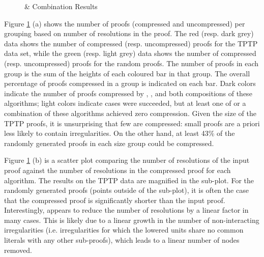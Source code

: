 {\begin{figure}[p]
 \caption{\GFOLU \& \FORPI Combination Results}
\label{fig:ex}

\end{figure}

Figure \ref{fig:ex} (a) shows the number of proofs (compressed and uncompressed) per grouping based on number of resolutions in the proof. The red (resp. dark grey) data shows the number of compressed (resp. uncompressed) proofs for the TPTP data set, while the green (resp. light grey) data shows the number of compressed (resp. uncompressed) proofs for the random proofs. The number of proofs in each group is the sum of the heights of each coloured bar in that group. The overall percentage of proofs compressed in a group is indicated on each bar. Dark colors indicate the number of proofs compressed by {\FORPI}, {\GFOLU}, and both compositions of these algorithms; light colors indicate cases were {\FORPI} succeeded, but at least one of {\GFOLU} or a combination of these algorithms achieved zero compression. 
Given the size of the TPTP proofs, it is unsurprising that few are compressed: small proofs are a priori less likely to contain irregularities. On the other hand, 
at least 43\% of the randomly generated proofs in each size group could be compressed.


Figure \ref{fig:ex} (b) is a scatter plot comparing the number of resolutions of the input proof against the number of resolutions in the compressed proof for each algorithm. The results on the TPTP data are magnified in the sub-plot. For the randomly generated proofs (points outside of the sub-plot), it is often the case that the compressed proof is significantly shorter than the input proof. Interestingly, {\GFOLU} appears to reduce the number of resolutions by a linear factor in many cases. This is likely due to a linear growth in the number of non-interacting irregularities (i.e. irregularities for which the lowered units share no common literals with any other sub-proofs), which leads to a linear number of nodes removed.


}
